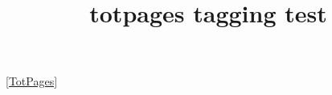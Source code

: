 \documentclass{article}
\title{totpages tagging test}
\begin{document}
\ref{TotPages}

\kant[1-20]
\end{document}
